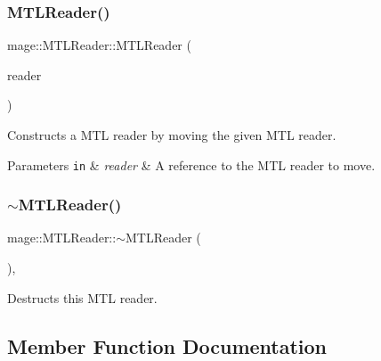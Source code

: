 \subsubsection{\texorpdfstring{M\+T\+L\+Reader()}{MTLReader()}\hspace{0.1cm}{\footnotesize\ttfamily [3/3]}}
{\footnotesize\ttfamily mage\+::\+M\+T\+L\+Reader\+::\+M\+T\+L\+Reader (\begin{DoxyParamCaption}\item[{\hyperlink{classmage_1_1_m_t_l_reader}{M\+T\+L\+Reader} \&\&}]{reader }\end{DoxyParamCaption})\hspace{0.3cm}{\ttfamily [default]}}

Constructs a M\+TL reader by moving the given M\+TL reader.


\begin{DoxyParams}[1]{Parameters}
\mbox{\tt in}  & {\em reader} & A reference to the M\+TL reader to move. \\
\hline
\end{DoxyParams}
\hypertarget{classmage_1_1_m_t_l_reader_a9d3216b2637bc9402d37c7438860f542}{}\label{classmage_1_1_m_t_l_reader_a9d3216b2637bc9402d37c7438860f542} 
\subsubsection{\texorpdfstring{$\sim$\+M\+T\+L\+Reader()}{~MTLReader()}}
{\footnotesize\ttfamily mage\+::\+M\+T\+L\+Reader\+::$\sim$\+M\+T\+L\+Reader (\begin{DoxyParamCaption}{ }\end{DoxyParamCaption})\hspace{0.3cm}{\ttfamily [virtual]}, {\ttfamily [default]}}

Destructs this M\+TL reader. 

\subsection{Member Function Documentation}
\hypertarget{classmage_1_1_m_t_l_reader_ae239ac085326919918a418edabcafeae}{}\label{classmage_1_1_m_t_l_reader_ae239ac085326919918a418edabcafeae} 
